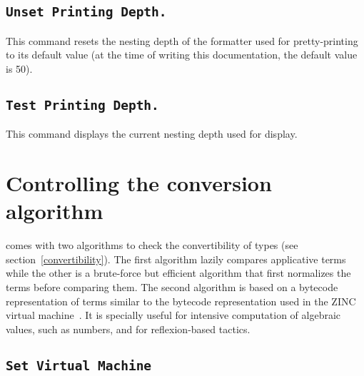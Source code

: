 \subsection[\tt Unset Printing Depth.]{\tt Unset Printing Depth.}
This command resets the nesting depth of the formatter used for
pretty-printing to its default value (at the
time of writing this documentation, the default value is 50).

\subsection[\tt Test Printing Depth.]{\tt Test Printing Depth.}
This command displays the current nesting depth used for display.




\section{Controlling the conversion algorithm}

{\Coq} comes with two algorithms to check the convertibility of types
(see section~\ref{convertibility}). The first algorithm lazily
compares applicative terms while the other is a brute-force but efficient
algorithm that first normalizes the terms before comparing them.  The
second algorithm is based on a bytecode representation of terms
similar to the bytecode representation used in the ZINC virtual
machine~\cite{Leroy90}. It is specially useful for intensive
computation of algebraic values, such as numbers, and for reflexion-based
tactics.

\subsection{\tt Set Virtual Machine
\label{SetVirtualMachine}
}

